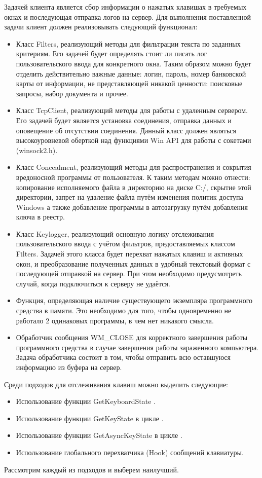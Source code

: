 Задачей клиента является сбор информации о нажатых клавишах в требуемых окнах и последующая отправка логов на сервер. Для выполнения поставленной задачи клиент должен реализовывать следующий функционал:
\begin{itemize}
	\item Класс Filters, реализующий методы для фильтрации текста по заданных критериям. Его задачей будет определять стоит ли писать лог пользовательского ввода для конкретного окна. Таким образом можно будет отделить действительно важные данные: логин, пароль, номер банковской карты от информации, не представляющей никакой ценности: поисковые запросы, набор документа и прочее.
	\item Класс TcpClient, реализующий методы для работы с удаленным сервером. Его задачей будет является установка соединения, отправка данных и оповещение об отсутствии соединения. Данный класс должен являться высокоуровневой оберткой над функциями Win API для работы с сокетами (winsock2.h).
	\item Класс Concealment, реализующий методы для распространения и сокрытия вредоносной программы от пользователя. К таким методам можно отнести: копирование исполняемого файла в директорию на диске C:/, скрытие этой директории, запрет на удаление файла путём изменения политик доступа Windows а также добавление программы в автозагрузку путём добавления ключа в реестр.
	\item Класс Keylogger, реализующий основную логику отслеживания пользовательского ввода с учётом фильтров, предоставляемых классом Filters. Задачей этого класса будет перехват нажатых клавиш и активных окон, и преобразование полученных данных в удобный текстовый формат с последующей отправкой на сервер. При этом необходимо предусмотреть случай, когда подключиться к серверу не удаётся.
	\item Функция, определяющая наличие существующего экземпляра программного средства в памяти. Это необходимо для того, чтобы одновременно не работало 2 одинаковых программы, в чем нет никакого смысла.
	\item Обработчик сообщения WM\_CLOSE для корректного завершения работы программного средства в случае завершения работы зараженного компьютера. Задача обработчика состоит в том, чтобы отправить всю оставшуюся информацию из буфера на сервер. 
\end{itemize} 

Среди подходов для отслеживания клавиш можно выделить следующие:
\begin{itemize}
	\item Использование функции GetKeyboardState \cite{msdn_WinApiGetKeyboardState}.
	\item Использование функции GetKeyState в цикле \cite{msdn_WinApiGetKeyState}.
	\item Использование функции GetAsyncKeyState в цикле \cite{msdn_WinApiGetAsyncKeyState}.
	\item Использование глобального перехватчика (Hook) сообщений клавиатуры.
\end{itemize} 
Рассмотрим каждый из подходов и выберем наилучший.

